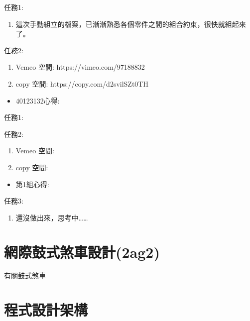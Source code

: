 \documentclass[]{article}
\begin{document}
任務1:

\begin{enumerate}
\def\labelenumi{\arabic{enumi}.}
\itemsep1pt\parskip0pt
\item
  這次手動組立的檔案，已漸漸熟悉各個零件之間的組合約束，很快就組起來了。
\end{enumerate}

任務2:

\begin{enumerate}
\def\labelenumi{\arabic{enumi}.}
\item
  Vemeo 空間: https://vimeo.com/97188832
\item
  copy 空間: https://copy.com/d2svilSZt0TH
\end{enumerate}

\begin{itemize}
\itemsep1pt\parskip0pt
\item
  40123132心得:
\end{itemize}

任務1:

任務2:

\begin{enumerate}
\def\labelenumi{\arabic{enumi}.}
\item
  Vemeo 空間:
\item
  copy 空間:
\end{enumerate}

\begin{itemize}
\itemsep1pt\parskip0pt
\item
  第1組心得:
\end{itemize}

任務3:

\begin{enumerate}
\def\labelenumi{\arabic{enumi}.}
\itemsep1pt\parskip0pt
\item
  還沒做出來，思考中\ldots{}\ldots{}
\end{enumerate}

\section{網際鼓式煞車設計(2ag2)}\label{ux7db2ux969bux9f13ux5f0fux715eux8ecaux8a2dux8a082ag2}

有關鼓式煞車

\section{程式設計架構}\label{ux7a0bux5f0fux8a2dux8a08ux67b6ux69cb}
\end{document}
